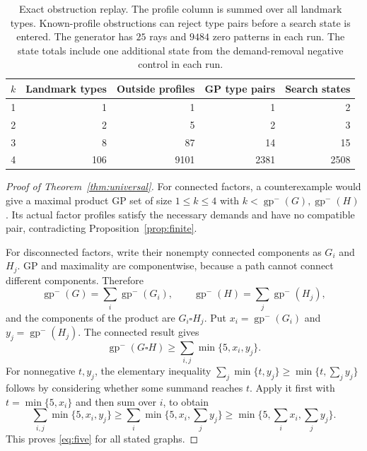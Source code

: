 \documentclass[11pt]{article}
\theoremstyle{definition}
\theoremstyle{remark}
\newcommand{\lgp}{\operatorname{gp}^{-}}
\begin{document}
\begin{table}[htbp]
\centering
\begin{tabular}{rrrrr}
\toprule
$k$ & Landmark types & Outside profiles & GP type pairs & Search states\\
\midrule
1&1&1&1&2\\
2&2&5&2&3\\
3&8&87&14&15\\
4&106&9101&2381&2508\\
\bottomrule
\end{tabular}
\caption{Exact obstruction replay. The profile column is summed over all
landmark types. Known-profile obstructions can reject type pairs before
a search state is entered. The generator has $25$ rays and $9484$ zero
patterns in each run. The state totals include one additional state
from the demand-removal negative control in each run.}
\label{tab:certificate}
\end{table}

\begin{proof}[Proof of Theorem~\ref{thm:universal}]
For connected factors, a counterexample would give a maximal product GP
set of size $1\leq k\leq4$ with $k<\lgp(G),\lgp(H)$. Its actual
factor profiles satisfy the necessary demands and have no compatible
pair, contradicting Proposition~\ref{prop:finite}.

For disconnected factors, write their nonempty connected components as
$G_i$ and $H_j$. GP and maximality are componentwise, because a path
cannot connect different components. Therefore
\[
 \lgp(G)=\sum_i\lgp(G_i),\qquad
 \lgp(H)=\sum_j\lgp(H_j),
\]
and the components of the product are $G_i\square H_j$. Put
$x_i=\lgp(G_i)$ and $y_j=\lgp(H_j)$. The connected result gives
\[
 \lgp(G\square H)\geq\sum_{i,j}\min\{5,x_i,y_j\}.
\]
For nonnegative $t,y_j$, the elementary inequality
$\sum_j\min\{t,y_j\}\geq\min\{t,\sum_jy_j\}$ follows by considering
whether some summand reaches $t$. Apply it first with $t=\min\{5,x_i\}$
and then sum over $i$, to obtain
\[
 \sum_{i,j}\min\{5,x_i,y_j\}
 \geq\sum_i\min\{5,x_i,\textstyle\sum_jy_j\}
 \geq\min\{5,\textstyle\sum_ix_i,\sum_jy_j\}.
\]
This proves \eqref{eq:five} for all stated graphs.
\end{proof}
\end{document}
